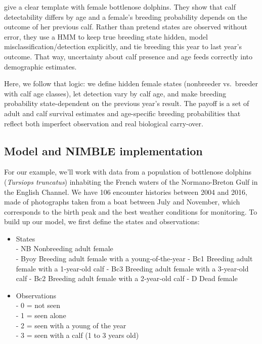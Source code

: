 \documentclass[
  12pt,
]{krantz}
\begin{document}
\citet{couet2019} give a clear template with female bottlenose dolphins. They show that calf detectability differs by age and a female's breeding probability depends on the outcome of her previous calf. Rather than pretend states are observed without error, they use a HMM to keep true breeding state hidden, model misclassification/detection explicitly, and tie breeding this year to last year's outcome. That way, uncertainty about calf presence and age feeds correctly into demographic estimates.

Here, we follow that logic: we define hidden female states (nonbreeder vs.~breeder with calf age classes), let detection vary by calf age, and make breeding probability state-dependent on the previous year's result. The payoff is a set of adult and calf survival estimates and age-specific breeding probabilities that reflect both imperfect observation and real biological carry-over.

\subsection{Model and NIMBLE implementation}\label{model-and-nimble-implementation-7}

For our example, we'll work with data from a population of bottlenose dolphins (\emph{Tursiops truncatus}) inhabiting the French waters of the Normano-Breton Gulf in the English Channel. We have 106 encounter histories between 2004 and 2016, made of photographs taken from a boat between July and November, which corresponds to the birth peak and the best weather conditions for monitoring. To build up our model, we first define the states and observations:

\begin{itemize}
\item
  States\\
  - NB Nonbreeding adult female\\
  - Byoy Breeding adult female with a young‐of‐the‐year
  - Bc1 Breeding adult female with a 1‐year‐old calf
  - Bc3 Breeding adult female with a 3‐year‐old calf
  - Bc2 Breeding adult female with a 2‐year‐old calf
  - D Dead female
\item
  Observations\\
  - 0 = not seen\\
  - 1 = seen alone\\
  - 2 = seen with a young of the year\\
  - 3 = seen with a calf (1 to 3 years old)
\end{itemize}
\end{document}
